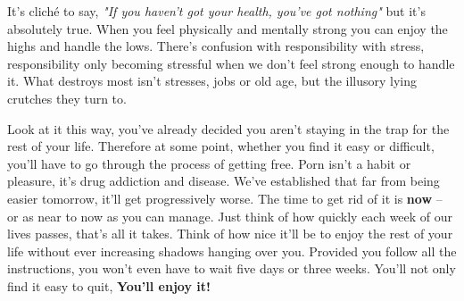 \documentclass[easypeasy.tex]{subfiles}
\begin{document}
It's cliché to say, \textit{"If you haven't got your health, you've got nothing"} but it's absolutely true. When you feel physically and mentally strong you can enjoy the highs and handle the lows. There's confusion with responsibility with stress, responsibility only becoming stressful when we don't feel strong enough to handle it. What destroys most isn't stresses, jobs or old age, but the illusory lying crutches they turn to.

Look at it this way, you've already decided you aren't staying in the trap for the rest of your life. Therefore at some point, whether you find it easy or difficult, you'll have to go through the process of getting free. Porn isn't a habit or pleasure, it's drug addiction and disease. We've established that far from being easier tomorrow, it'll get progressively worse. The time to get rid of it is \textbf{now} -- or as near to now as you can manage. Just think of how quickly each week of our lives passes, that's all it takes. Think of how nice it'll be to enjoy the rest of your life without ever increasing shadows hanging over you. Provided you follow all the instructions, you won't even have to wait five days or three weeks. You'll not only find it easy to quit, \textbf{You'll enjoy it!}
\end{document}
